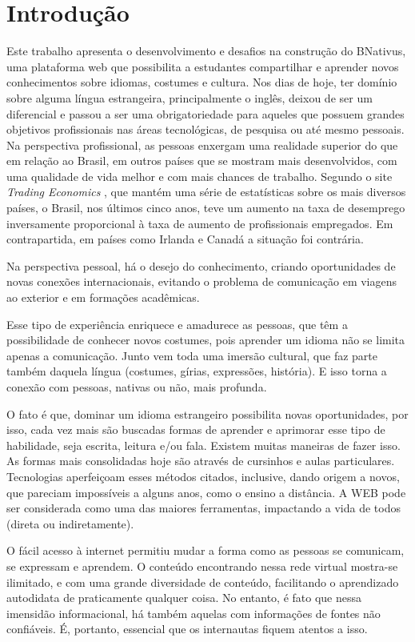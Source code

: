 \chapter{Introdução}

Este trabalho apresenta o desenvolvimento e desafios na construção do BNativus,  uma plataforma web que possibilita a estudantes compartilhar e aprender novos conhecimentos sobre idiomas, costumes e cultura. 
Nos dias de hoje, ter domínio sobre alguma língua estrangeira, principalmente o inglês, deixou de ser um diferencial e passou a ser uma obrigatoriedade para aqueles que possuem grandes objetivos profissionais nas áreas tecnológicas, de pesquisa ou até mesmo pessoais. Na perspectiva profissional, as pessoas enxergam uma realidade superior do que em relação ao Brasil, em outros países que se mostram mais desenvolvidos, com uma qualidade de vida melhor e com mais chances de trabalho. Segundo o site \textit{Trading Economics} \cite{TradingEconomics}, que mantém uma série de estatísticas sobre os mais diversos países, o Brasil, nos últimos cinco anos, teve um aumento na taxa de desemprego inversamente proporcional à taxa de aumento de profissionais empregados. Em contrapartida, em países como Irlanda e Canadá a situação foi contrária.

 Na perspectiva pessoal, há o desejo do conhecimento, criando oportunidades de novas conexões internacionais, evitando o problema de comunicação em viagens ao exterior e em formações acadêmicas.

Esse tipo de experiência enriquece e amadurece as pessoas, que têm a possibilidade de conhecer novos costumes, pois aprender um idioma não se limita apenas a comunicação. Junto vem toda uma imersão cultural, que faz parte também daquela língua (costumes, gírias, expressões, história). E isso torna a conexão com pessoas, nativas ou não, mais profunda.

O fato é que, dominar um idioma estrangeiro possibilita novas oportunidades, por isso, cada vez mais são buscadas formas de aprender e aprimorar esse tipo de habilidade, seja escrita, leitura e/ou fala. Existem muitas maneiras de fazer isso. As formas mais consolidadas hoje são através de cursinhos e aulas particulares. Tecnologias aperfeiçoam esses métodos citados, inclusive, dando origem a novos, que pareciam impossíveis a alguns anos, como o ensino a distância. A WEB pode ser considerada como uma das maiores ferramentas, impactando a vida de todos (direta ou indiretamente).

O fácil acesso à internet permitiu mudar a forma como as pessoas se comunicam, se expressam e aprendem. O conteúdo encontrando nessa rede virtual mostra-se ilimitado, e com uma grande diversidade de conteúdo, facilitando o aprendizado autodidata de praticamente qualquer coisa. No entanto, é fato que nessa imensidão informacional, há também aquelas com informações de fontes não confiáveis. É, portanto,  essencial que os internautas fiquem atentos a isso.

